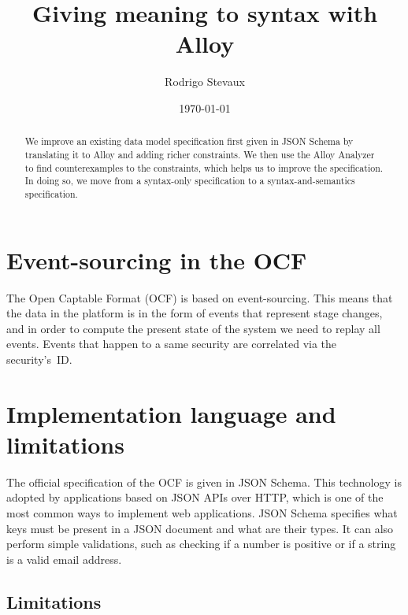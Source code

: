 \documentclass[12pt]{article}
\begin{document}
\title{Giving meaning to syntax with Alloy}

\author{Rodrigo Stevaux}

\date{\today}

\maketitle


\begin{abstract}
We improve an existing data model specification first given in JSON Schema by translating it to Alloy and adding richer constraints. We then use the Alloy Analyzer to find counterexamples to the constraints, which helps us to improve the specification. In doing so, we move from a syntax-only specification to a syntax-and-semantics specification.
\end{abstract}

\section{Event-sourcing in the OCF}

The Open Captable Format (OCF) is based on event-sourcing. This means that the data in the platform is in the form of events that represent stage changes, and in order to compute the present state of the system we need to replay all events. Events that happen to a same security are correlated via the security's~\@{ID}.

\section{Implementation language and limitations}

The official specification of the OCF is given in JSON Schema. This technology is adopted by applications based on JSON APIs over HTTP, which is one of the most common ways to implement web applications. JSON Schema specifies what keys must be present in a JSON document and what are their types. It can also perform simple validations, such as checking if a number is positive or if a string is a valid email address.

\subsection{Limitations}
\end{document}
